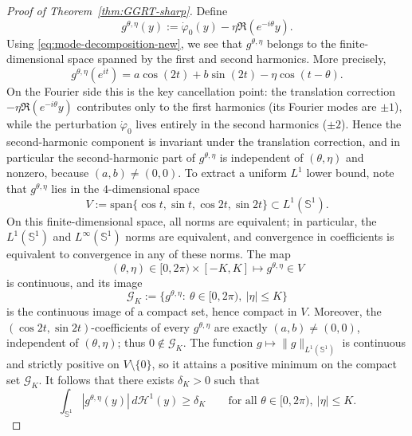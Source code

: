 \begin{proof}[Proof of Theorem~\ref{thm:GGRT-sharp}]
Define
\[
g^{\theta,\eta}(y)
:=
\dot\varphi_0(y)-\eta \Re(e^{-i\theta}y).
\]
Using \eqref{eq:mode-decomposition-new}, we see that $g^{\theta,\eta}$ belongs
to the finite-dimensional space spanned by the first and second harmonics.
More precisely,
\[
g^{\theta,\eta}(e^{it})
=
a\cos(2t)+b\sin(2t)-\eta \cos(t-\theta).
\]
On the Fourier side this is the key cancellation point: the translation
correction $-\eta\Re(e^{-i\theta}y)$ contributes only to the first harmonics
(its Fourier modes are $\pm 1$), while the perturbation
$\dot\varphi_0$ lives entirely in the second harmonics ($\pm 2$). Hence the
second-harmonic component is invariant under the translation correction, and
in particular the second-harmonic part of $g^{\theta,\eta}$ is independent of
$(\theta,\eta)$ and nonzero, because $(a,b)\neq (0,0)$. To extract a uniform \(L^1\) lower bound, note that
\(g^{\theta,\eta}\) lies in the \(4\)-dimensional space
\[
V:=\mathrm{span}\bigl\{\cos t,\sin t,\cos 2t,\sin 2t\bigr\}\subset L^1(\mathbb S^1).
\]
On this finite-dimensional space, all norms are equivalent; in particular, the
\(L^1(\mathbb S^1)\) and \(L^\infty(\mathbb S^1)\) norms are equivalent, and
convergence in coefficients is equivalent to convergence in any of these norms. The map
\[
(\theta,\eta)\in [0,2\pi)\times [-K,K]\longmapsto g^{\theta,\eta}\in V
\]
is continuous, and its image
\[
\mathcal G_K:=\{g^{\theta,\eta}:\ \theta\in[0,2\pi),\ |\eta|\leq K\}
\]
is the continuous image of a compact set, hence compact in \(V\). Moreover, the
\((\cos 2t,\sin 2t)\)-coefficients of every \(g^{\theta,\eta}\) are exactly
\((a,b)\neq (0,0)\), independent of \((\theta,\eta)\); thus \(0\notin
\mathcal G_K\). The function \(g\mapsto\|g\|_{L^1(\mathbb S^1)}\) is continuous
and strictly positive on \(V\setminus\{0\}\), so it attains a positive minimum
on the compact set \(\mathcal G_K\). It follows that there exists
$\delta_K>0$ such that
\begin{equation}\label{eq:uniform-l1-lower-new}
\int_{\mathbb S^1}|g^{\theta,\eta}(y)|\,d\mathcal H^1(y)\geq \delta_K
\qquad
\text{for all }\theta\in[0,2\pi),\ |\eta|\leq K.
\end{equation}


\end{proof}
